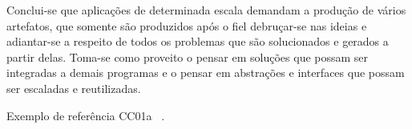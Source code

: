 \documentclass[12pt]{article}
\begin{document}
Conclui-se que aplicações de determinada escala demandam a produção de vários artefatos, que somente são produzidos após o fiel debruçar-se nas ideias e adiantar-se a respeito de todos os problemas que são solucionados e gerados a partir delas. Toma-se como proveito o pensar em soluções que possam ser integradas a demais programas e o pensar em abstrações e interfaces que possam ser escaladas e reutilizadas.

Exemplo de referência CC01a ~\cite{CC01}.

{}

\end{document}
